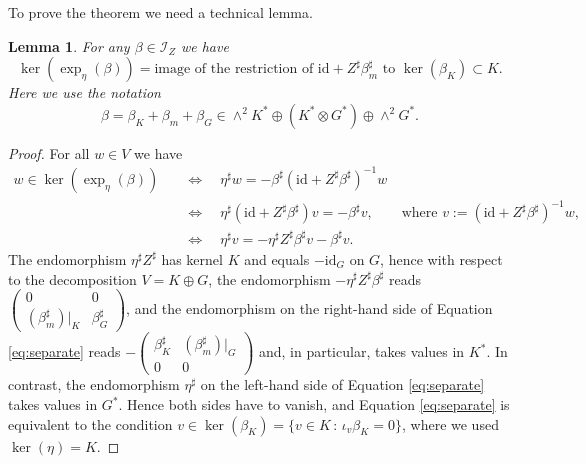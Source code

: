 \documentclass[11pt,thmsa]{amsart}
\newtheorem{lemma}[theorem]{Lemma}
\theoremstyle{definition}
\newcommand{\id}{\mathrm{id}}
\begin{document}
To prove the theorem we need a technical lemma.
\begin{lemma}\label{lem:kernel}
For  any $\beta \in \mathcal{I}_Z$ we have
$$\ker(\exp_{\eta}(\beta))= \text{image of the restriction of  $\id + Z^\sharp \beta^\sharp_m$ to $\ker(\beta_K)\subset K$}.$$ Here we
 use the notation
$$\beta = \beta_K + \beta_m + \beta_G \in \wedge^2 K^*\oplus (K^*\otimes G^*) \oplus \wedge^2 G^*.$$
\end{lemma}



\begin{proof}  For all $w\in V$ we have
\begin{align}
w\in \ker(\exp_{\eta}(\beta))  \quad &\Longleftrightarrow \quad \eta^{\sharp}w=-\beta^\sharp(\id + Z^{\sharp}\beta^\sharp)^{-1}w \nonumber\\
\quad &\Longleftrightarrow \quad \eta^{\sharp}(\id + Z^{\sharp}\beta^\sharp)v=-\beta^\sharp v \nonumber, \qquad \textrm{where $v:=(\id + Z^{\sharp}\beta^\sharp)^{-1}w$},\\
\quad & \Longleftrightarrow \quad \eta^{\sharp}v=-\eta^{\sharp}Z^{\sharp}\beta^\sharp v-\beta^\sharp v. \label{eq:separate}
\end{align}
The endomorphism $\eta^{\sharp}Z^\sharp$ has kernel $K$ and equals $-\mathrm{id}_G$ on $G$, hence
with respect to the decomposition $V=K\oplus G$,
the endomorphism 
$-\eta^{\sharp}Z^\sharp\beta^\sharp$ reads
$\left(\begin{array}{cc}0 &  0 \\
(\beta_m^{\sharp})|_K & \beta_G^{\sharp}\end{array}\right)$, and the endomorphism on the  right-hand side of Equation \eqref{eq:separate} reads 
$-\left(\begin{array}{cc}\beta_K^{\sharp} & (\beta_m^{\sharp})|_G\\ 0 &  0\end{array}\right)$ and, in particular, takes values in $K^*$. In contrast, the endomorphism $\eta^{\sharp}$ on the left-hand side of  Equation \eqref{eq:separate} takes values in $G^*$. Hence both sides have to vanish, and Equation \eqref{eq:separate} is equivalent to the condition  $v\in \ker(\beta_K)=\{v \in K \, : \, \iota_v\beta_K=0\}$,
where we used $\ker(\eta)=K$.\end{proof}
\end{document}
